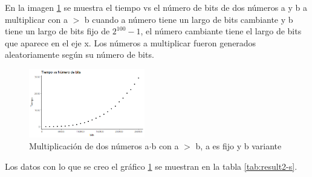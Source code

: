 \documentclass[10pt,journal,compsoc]{IEEEtran}
\begin{document}
 
En la imagen \ref{fig:result2-s} se muestra el tiempo vs el número de bits de dos números a y b a multiplicar con a $>$ b cuando a número tiene un largo de bits cambiante y b tiene un largo de bits fijo de  $2^100-1$, el número cambiante tiene el largo de bits que aparece en el eje x. Los números a multiplicar fueron generados aleatoriamente según su número de bits. 

\begin{figure}[!h]
    \centering
    \includegraphics[width=0.45\textwidth]{result2-s}
    \caption{Multiplicación de dos números a$\cdot$b con a $>$ b,  a es fijo y b variante}
    \label{fig:result2-s}
\end{figure}

Los datos con lo que se creo el gráfico \ref{fig:result2-s} se muestran en la tabla \ref{tab:result2-s}.
\end{document}
